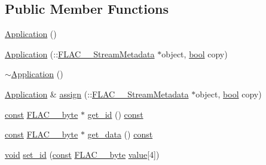 \subsection*{Public Member Functions}
\begin{DoxyCompactItemize}
\item 
\hyperlink{class_f_l_a_c_1_1_metadata_1_1_application_aa84225a44b245782ef53f978c08438d0}{Application} ()
\item 
\hyperlink{class_f_l_a_c_1_1_metadata_1_1_application_a354471e537af33ba0c86de4db988efd1}{Application} (\+::\hyperlink{struct_f_l_a_c_____stream_metadata}{F\+L\+A\+C\+\_\+\+\_\+\+Stream\+Metadata} $\ast$object, \hyperlink{mac_2config_2i386_2lib-src_2libsoxr_2soxr-config_8h_abb452686968e48b67397da5f97445f5b}{bool} copy)
\item 
\hyperlink{class_f_l_a_c_1_1_metadata_1_1_application_a1a40d48f70ccee0ca067b5b486bdf0c7}{$\sim$\+Application} ()
\item 
\hyperlink{class_f_l_a_c_1_1_metadata_1_1_application}{Application} \& \hyperlink{class_f_l_a_c_1_1_metadata_1_1_application_a47f68d7001ef094a916d3b13fe589fc2}{assign} (\+::\hyperlink{struct_f_l_a_c_____stream_metadata}{F\+L\+A\+C\+\_\+\+\_\+\+Stream\+Metadata} $\ast$object, \hyperlink{mac_2config_2i386_2lib-src_2libsoxr_2soxr-config_8h_abb452686968e48b67397da5f97445f5b}{bool} copy)
\item 
\hyperlink{getopt1_8c_a2c212835823e3c54a8ab6d95c652660e}{const} \hyperlink{ordinals_8h_a5eb569b12d5b047cdacada4d57924ee3}{F\+L\+A\+C\+\_\+\+\_\+byte} $\ast$ \hyperlink{class_f_l_a_c_1_1_metadata_1_1_application_a13dcf609bba5c76a56e98bd6bfbb17c1}{get\+\_\+id} () \hyperlink{getopt1_8c_a2c212835823e3c54a8ab6d95c652660e}{const} 
\item 
\hyperlink{getopt1_8c_a2c212835823e3c54a8ab6d95c652660e}{const} \hyperlink{ordinals_8h_a5eb569b12d5b047cdacada4d57924ee3}{F\+L\+A\+C\+\_\+\+\_\+byte} $\ast$ \hyperlink{class_f_l_a_c_1_1_metadata_1_1_application_af793311d25fbf68ed99c8f0d28c43ada}{get\+\_\+data} () \hyperlink{getopt1_8c_a2c212835823e3c54a8ab6d95c652660e}{const} 
\item 
\hyperlink{sound_8c_ae35f5844602719cf66324f4de2a658b3}{void} \hyperlink{class_f_l_a_c_1_1_metadata_1_1_application_a1091e3153598a350db898ac2c52db979}{set\+\_\+id} (\hyperlink{getopt1_8c_a2c212835823e3c54a8ab6d95c652660e}{const} \hyperlink{ordinals_8h_a5eb569b12d5b047cdacada4d57924ee3}{F\+L\+A\+C\+\_\+\+\_\+byte} \hyperlink{lib_2expat_8h_a4a30a13b813682e68c5b689b45c65971}{value}\mbox{[}4\mbox{]})
\item 

\end{DoxyCompactItemize}
